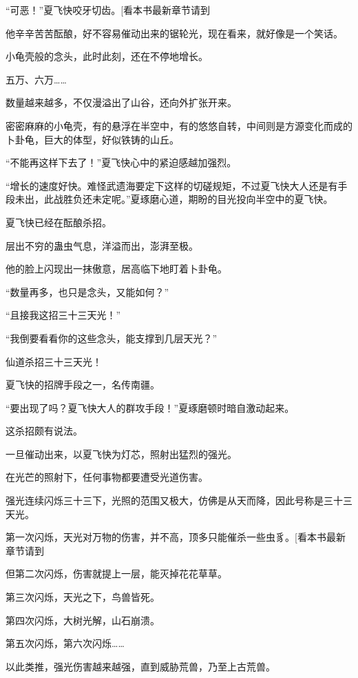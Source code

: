 
\begin{this_body}

“可恶！”夏飞快咬牙切齿。[看本书最新章节请到

他辛辛苦苦酝酿，好不容易催动出来的锯轮光，现在看来，就好像是一个笑话。

小龟壳般的念头，此时此刻，还在不停地增长。

五万、六万……

数量越来越多，不仅漫溢出了山谷，还向外扩张开来。

密密麻麻的小龟壳，有的悬浮在半空中，有的悠悠自转，中间则是方源变化而成的卜卦龟，巨大的体型，好似铁铸的山丘。

“不能再这样下去了！”夏飞快心中的紧迫感越加强烈。

“增长的速度好快。难怪武遗海要定下这样的切磋规矩，不过夏飞快大人还是有手段未出，此战胜负还未定呢。”夏琢磨心道，期盼的目光投向半空中的夏飞快。

夏飞快已经在酝酿杀招。

层出不穷的蛊虫气息，洋溢而出，澎湃至极。

他的脸上闪现出一抹傲意，居高临下地盯着卜卦龟。

“数量再多，也只是念头，又能如何？”

“且接我这招三十三天光！”

“我倒要看看你的这些念头，能支撑到几层天光？”

仙道杀招三十三天光！

夏飞快的招牌手段之一，名传南疆。

“要出现了吗？夏飞快大人的群攻手段！”夏琢磨顿时暗自激动起来。

这杀招颇有说法。

一旦催动出来，以夏飞快为灯芯，照射出猛烈的强光。

在光芒的照射下，任何事物都要遭受光道伤害。

强光连续闪烁三十三下，光照的范围又极大，仿佛是从天而降，因此号称是三十三天光。

第一次闪烁，天光对万物的伤害，并不高，顶多只能催杀一些虫豸。[看本书最新章节请到

但第二次闪烁，伤害就提上一层，能灭掉花花草草。

第三次闪烁，天光之下，鸟兽皆死。

第四次闪烁，大树光解，山石崩溃。

第五次闪烁，第六次闪烁……

以此类推，强光伤害越来越强，直到威胁荒兽，乃至上古荒兽。


\end{this_body}
